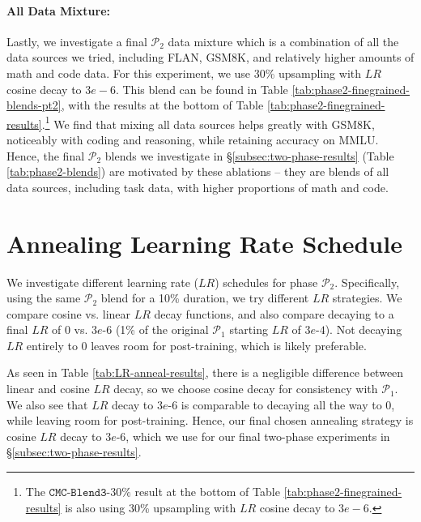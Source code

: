 \documentclass[11pt]{article}
\newcommand{\phaseone}{$\mathcal{P}_1$\xspace}
\newcommand{\phasetwo}{$\mathcal{P}_2$\xspace}
\begin{document}
\paragraph{All Data Mixture:} Lastly, we investigate a final \phasetwo data mixture which is a combination of all the data sources we tried, including FLAN, GSM8K, and relatively higher amounts of math and code data. For this experiment, we use 30\% upsampling with $LR$ cosine decay to $3e-6$. This blend can be found in Table \ref{tab:phase2-finegrained-blends-pt2}, with the results at the bottom of Table \ref{tab:phase2-finegrained-results}.\footnote{The $\mathtt{CMC}$-$\mathtt{Blend3}$-$30\%$ result at the bottom of Table \ref{tab:phase2-finegrained-results} is also using 30\% upsampling with $LR$ cosine decay to $3e-6$.} We find that mixing all data sources %
helps greatly with GSM8K, noticeably with coding and reasoning, while retaining accuracy on MMLU. Hence, the final \phasetwo blends we investigate in \S\ref{subsec:two-phase-results} (Table \ref{tab:phase2-blends}) are motivated by these ablations -- they are blends of all data sources, including task data, with higher proportions of math and code.

\section{Annealing Learning Rate Schedule}
\label{app:lr_schedule}

We investigate different learning rate ($LR$) schedules for phase \phasetwo. 
Specifically, using the same \phasetwo blend for a 10\% duration, 
we try different $LR$ strategies. 
We compare cosine vs. linear $LR$ decay functions, and also compare decaying to a final $LR$ of $0$ vs. $3e$-$6$ (1\% of the original \phaseone starting $LR$ of $3e$-$4$). 
Not decaying $LR$ entirely to 0 leaves room for post-training, which is likely preferable. 

As seen in Table \ref{tab:LR-anneal-results}, there is a negligible difference between linear and cosine $LR$ decay, so we choose cosine decay for consistency with \phaseone.
We also see that $LR$ decay to $3e$-$6$ is comparable to decaying all the way to $0$, while leaving room for post-training. 
Hence, our final chosen annealing strategy is cosine $LR$ decay to $3e$-$6$, which we use for our final two-phase experiments in \S\ref{subsec:two-phase-results}.
\end{document}
